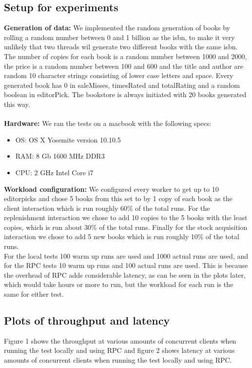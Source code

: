 \documentclass{article}
\theoremstyle{plain}
\theoremstyle{nonumberplain}
\begin{document}
\subsection{Setup for experiments}

\textbf{Generation of data:}
We implemented the random generation of books by rolling a random number between 0 and 1 billion as the isbn, to make it very unlikely that two threads wil generate two different books with the same isbn. The number of copies for each book is a random number between 1000 and 2000, the price is a random number between 100 and 600 and the title and author are random 10 character strings consisting of lower case letters and space. Every generated book has 0 in saleMisses, timesRated and totalRating and a random boolean in editorPick. The bookstore is always initiated with 20 books generated this way.\\\\
\textbf{Hardware:}
We ran the tests on a macbook with the following specs:
\begin{itemize}
	\item OS: OS X Yosemite version 10.10.5
	\item RAM: 8 Gb 1600 MHz DDR3
	\item CPU: 2 GHz Intel Core i7
\end{itemize}
\textbf{Workload configuration:}
We configured every worker to get up to 10 editorpicks and chose 5 books from this set to by 1 copy of each book as the client interaction which is run roughly 60\% of the total runs. For the replenishment interaction we chose to add 10 copies to the 5 books with the least copies, which is run about 30\% of the total runs. Finally for the stock acquisition interaction we chose to add 5 new books which is run roughly 10\% of the total runs.\\
For the local tests 100 warm up runs are used and 1000 actual runs are used, and for the RPC tests 10 warm up runs and 100 actual runs are used. This is because the overhead of RPC adds considerable latency, as can be seen in the plots later, which would take hours or more to run, but the workload for each run is the same for either test.


\subsection{Plots of throughput and latency}

Figure 1 shows the throughput at various amounts of concurrent clients when running the test locally and using RPC and figure 2 shows latency at various amounts of concurrent clients when running the test locally and using RPC.
\end{document}
